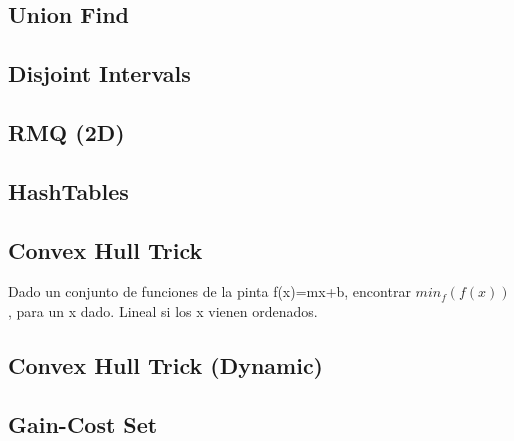 \subsection{Union Find}
\subsection{Disjoint Intervals}
\subsection{RMQ (2D)}
\subsection{HashTables} %
\subsection{Convex Hull Trick}
Dado un conjunto de funciones de la pinta f(x)=mx+b, encontrar $min_f(f(x))$, para un x dado. Lineal si los x vienen ordenados.
\subsection{Convex Hull Trick (Dynamic)}
\subsection{Gain-Cost Set} %
